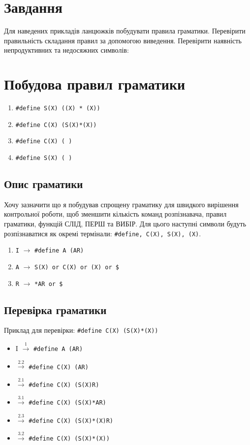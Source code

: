 \section{Завдання}
Для наведених прикладів ланцюжків побудувати правила граматики.
Перевірити правильність складання правил за допомогою виведення.
Перевірити наявність непродуктивних та недосяжних символів:


\section{Побудова правил граматики}
\begin{enumerate}
    \item \verb|#define S(X) ((X) * (X))|
    \item \verb|#define C(X) (S(X)*(X))|
    \item \verb|#define C(X) ( )|
    \item \verb|#define S(X) ( )|
\end{enumerate}

\subsection{Опис граматики}
Хочу зазначити що я побудував спрощену граматику для швидкого вирішення контрольної роботи, щоб зменшити кількість команд розпізнавача, правил граматики, функцій СЛІД, ПЕРШ та ВИБІР.
Для цього наступні символи будуть розпізнаватися як окремі термінали:  \verb|#define, C(X), S(X), (X)|.

\begin{enumerate}
    \item  \verb|I| $\to$ \verb|#define A (AR)|
    \item  \verb|A| $\to$ \verb|S(X) or C(X) or (X) or $|
    \item  \verb|R| $\to$ \verb|*AR or $|
\end{enumerate}

\newpage
\subsection{Перевірка граматики}
Приклад для перевірки: \verb|#define C(X) (S(X)*(X))|
\begin{itemize}
    \item[]  I $\xrightarrow{1}$ \verb|#define A (AR)|
    \item[]  $\xrightarrow{2.2}$ \verb|#define C(X) (AR)|
    \item[]  $\xrightarrow{2.1}$ \verb|#define C(X) (S(X)R)|
    \item[]  $\xrightarrow{3.1}$ \verb|#define C(X) (S(X)*AR)|
    \item[]  $\xrightarrow{2.3}$ \verb|#define C(X) (S(X)*(X)R)|
    \item[]  $\xrightarrow{3.2}$ \verb|#define C(X) (S(X)*(X))|
\end{itemize}


